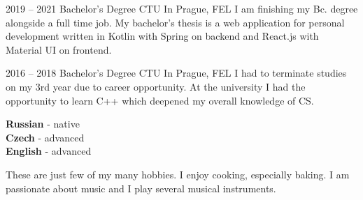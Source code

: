 \documentclass[9pt]{developercv} %
\begin{document}
\newpage



\begin{entrylist}
    \entry
    {2019 -- 2021}
    {Bachelor's Degree}
    {CTU In Prague, FEL}
    {
        I am finishing my Bc. degree alongside a full time job.
        My bachelor's thesis is a web application for personal development written in Kotlin with Spring on backend and React.js with Material UI on frontend.
    }

    \entry
    {2016 -- 2018}
    {Bachelor's Degree}
    {CTU In Prague, FEL}
    {
        I had to terminate studies on my 3rd year due to career opportunity.
        At the university I had the opportunity to learn C++ which deepened my overall knowledge of CS.
    }
\end{entrylist}


\begin{minipage}[t]{0.3\textwidth}
    \vspace{-\baselineskip} %


    \textbf{Russian} - native\\
    \textbf{Czech} - advanced\\
    \textbf{English} - advanced
\end{minipage}
\hfill
\begin{minipage}[t]{0.7\textwidth}
    \vspace{-\baselineskip} %


    These are just few of my many hobbies.
    I enjoy cooking, especially baking.
    I am passionate about music and I play several musical instruments.

\end{minipage}
\hfill

\end{document}
